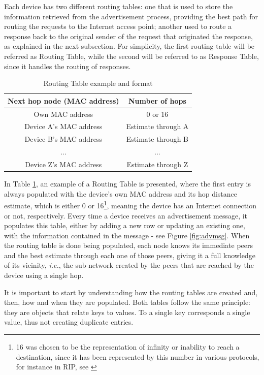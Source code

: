Each device has two different routing tables: one that is used to store the information retrieved from the advertisement process, providing the best path for routing the requests to the Internet access point; another used to route a response back to the original sender of the request that originated the response, as explained in the next subsection. For simplicity, the first routing table will be referred as Routing Table, while the second will be referred to as Response Table, since it handles the routing of responses. 

\begin{table}[ht]
\centering
\bgroup
\def\arraystretch{2.5}
\begin{tabular}{|c|c|}
\hline
\textbf{Next hop node (MAC address)} & \textbf{Number of hops} \\ \hline
Own MAC address & 0 or 16 \\ \hline
Device A's MAC address & Estimate through A \\ \hline
Device B's MAC address & Estimate through B \\ \hline
... & ... \\ \hline
Device Z's MAC address & Estimate through Z \\ \hline
\end{tabular}
\egroup
\caption{Routing Table example and format}
\label{tab:routTables}
\end{table}

In Table \ref{tab:routTables}, an example of a Routing Table is presented, where the first entry is always populated with the device's own \gls{MAC} address and its hop distance estimate, which is either 0 or 16\footnote{16 was chosen to be the representation of infinity or inability to reach a destination, since it has been represented by this number in various protocols, for instance in \gls{RIP}, see \cite{ripprotocol}}, meaning the device has an Internet connection or not, respectively. Every time a device receives an advertisement message, it populates this table, either by adding a new row or updating an existing one, with the information contained in the message - see Figure \ref{fig:advmsg}. When the routing table is done being populated, each node knows its immediate peers and the best estimate through each one of those peers, giving it a full knowledge of its vicinity, \textit{i.e.}, the sub-network created by the peers that are reached by the device using a single hop.

It is important to start by understanding how the routing tables are created and, then, how and when they are populated. Both tables follow the same principle: they are objects that relate keys to values. To a single key corresponds a single value, thus not creating duplicate entries.

